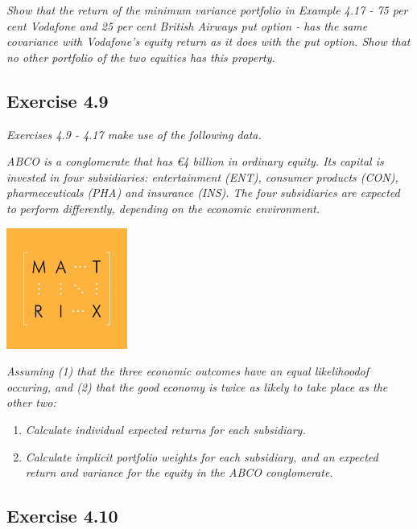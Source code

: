 \documentclass[]{book}
\newcommand{\euro}{€}
\theoremstyle{definition}
\theoremstyle{definition}
\theoremstyle{remark}
\begin{document}
\emph{Show that the return of the minimum variance portfolio in Example
4.17 - 75 per cent Vodafone and 25 per cent British Airways put option -
has the same covariance with Vodafone's equity return as it does with
the put option. Show that no other portfolio of the two equities has
this property.} \citep[p.117]{book}

\subsection{Exercise 4.9}\label{exercise-4.9}

\emph{Exercises 4.9 - 4.17 make use of the following data.}
\citep[p.117]{book}

\emph{ABCO is a conglomerate that has \euro{}4 billion in ordinary
equity. Its capital is invested in four subsidiaries: entertainment
(ENT), consumer products (CON), pharmeceuticals (PHA) and insurance
(INS). The four subsidiaries are expected to perform differently,
depending on the economic environment.} \citep[p.117]{book}

\begin{center}\includegraphics[width=150px]{figures/matrix} \end{center}

\emph{Assuming (1) that the three economic outcomes have an equal
likelihoodof occuring, and (2) that the good economy is twice as likely
to take place as the other two:} \citep[p.118]{book}

\begin{enumerate}
\def\labelenumi{\alph{enumi}.}
\item
  \emph{Calculate individual expected returns for each subsidiary.}
  \citep[p.118]{book}
\item
  \emph{Calculate implicit portfolio weights for each subsidiary, and an
  expected return and variance for the equity in the ABCO conglomerate.}
  \citep[p.118]{book}
\end{enumerate}

\subsection{Exercise 4.10}\label{exercise-4.10}
\end{document}
